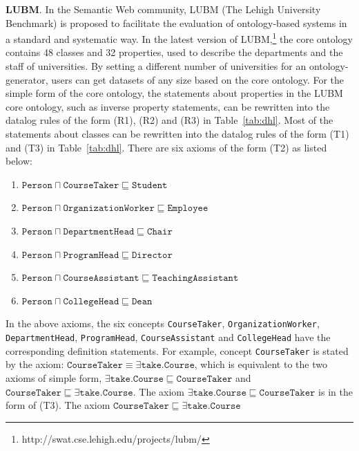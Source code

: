 \textbf{LUBM}. In the Semantic Web community, LUBM
(The Lehigh University Benchmark) is proposed to
facilitate the evaluation of ontology-based systems
in a standard and systematic way.
In the latest version of LUBM,\footnote{http://swat.cse.lehigh.edu/projects/lubm/}
the core ontology contains 48 classes and 32 properties, used to describe the departments and the staff of
universities. By setting a different number of universities for an ontology-generator, users can get datasets of any size based on the core ontology.
%
For the simple form of the core ontology,
the statements about properties in the LUBM core ontology, such as inverse property statements,
can be rewritten into the datalog rules of the form (R1), (R2) and (R3) in Table~\ref{tab:dhl}.
Most of the statements about classes can be rewritten into the datalog rules of the form (T1) and (T3)
in Table~\ref{tab:dhl}. There are six axioms of the form (T2) as listed below:
\begin{enumerate}[leftmargin=8ex,label=($\alpha_{\arabic*}$),ref=$\alpha_{\arabic*}$]
  \item $\texttt{Person}\sqcap\texttt{CourseTaker}\sqsubseteq\texttt{Student}$\label{lubm:a1}
  \item $\texttt{Person}\sqcap\texttt{OrganizationWorker}\sqsubseteq\texttt{Employee}$\label{lubm:a2}
  \item $\texttt{Person}\sqcap\texttt{DepartmentHead}\sqsubseteq\texttt{Chair}$\label{lubm:a3}
  \item $\texttt{Person}\sqcap\texttt{ProgramHead}\sqsubseteq\texttt{Director}$\label{lubm:a4}
  \item $\texttt{Person}\sqcap\texttt{CourseAssistant}\sqsubseteq\texttt{TeachingAssistant}$\label{lubm:a5}
  \item $\texttt{Person}\sqcap\texttt{CollegeHead}\sqsubseteq\texttt{Dean}$\label{lubm:a6}
\end{enumerate}
In the above axioms, the six concepts \texttt{CourseTaker}, \texttt{OrganizationWorker},
\texttt{DepartmentHead}, \texttt{ProgramHead}, \texttt{CourseAssistant}
and \texttt{CollegeHead} have the corresponding definition statements.
For example, concept \texttt{CourseTaker} is stated by the axiom:
$\texttt{CourseTaker}\equiv\exists\texttt{take}.\texttt{Course}$,
which is equivalent to the two axioms of simple form,
$\exists\texttt{take}.\texttt{Course}\sqsubseteq\texttt{CourseTaker}$
and $\texttt{CourseTaker}\sqsubseteq\exists\texttt{take}.\texttt{Course}$.
The axiom $\exists\texttt{take}.\texttt{Course}\sqsubseteq\texttt{CourseTaker}$
is in the form of (T3). The axiom $\texttt{CourseTaker}\sqsubseteq\exists\texttt{take}.\texttt{Course}$
